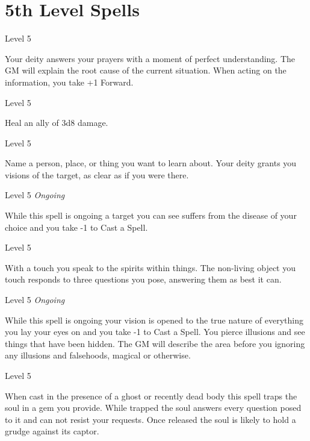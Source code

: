  


\section{5th Level Spells}     
 
\startSpellName
{} 	Level 5
\stopSpellName
 

Your deity answers your prayers with a moment of perfect understanding. The GM will explain the root cause of the current situation. When acting on the information, you take +1 Forward.

 
\startSpellName
{} 	Level 5
\stopSpellName
 

Heal an ally of 3d8 damage.

 
\startSpellName
{} 	Level 5
\stopSpellName
 

Name a person, place, or thing you want to learn about. Your deity grants you visions of the target, as clear as if you were there.

 
\startSpellName
{} 	Level 5	{\em Ongoing} 
\stopSpellName
 

While this spell is ongoing a target you can see suffers from the disease of your choice and you take -1 to Cast a Spell.

 
\startSpellName
{} 	Level 5
\stopSpellName
 

With a touch you speak to the spirits within things. The non-living object you touch responds to three questions you pose, answering them as best it can.

 
\startSpellName
{} 	Level 5	{\em Ongoing} 
\stopSpellName
 

While this spell is ongoing your vision is opened to the true nature of everything you lay your eyes on and you take -1 to Cast a Spell. You pierce illusions and see things that have been hidden. The GM will describe the area before you ignoring any illusions and falsehoods, magical or otherwise.

 
\startSpellName
{} 	Level 5
\stopSpellName
 

When cast in the presence of a ghost or recently dead body this spell traps the soul in a gem you provide. While trapped the soul answers every question posed to it and can not resist your requests. Once released the soul is likely to hold a grudge against its captor.

